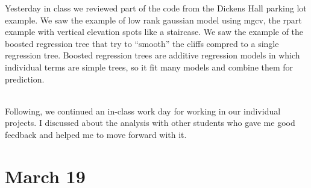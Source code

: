 \documentclass[
]{book}
\begin{document}
Yesterday in class we reviewed part of the code from the Dickens Hall parking lot example. We saw the example of low rank gaussian model using mgcv, the rpart example with vertical elevation spots like a staircase. We saw the example of the boosted regression tree that try to ``smooth'' the cliffs compred to a single regression tree. Boosted regression trees are additive regression models in which individual terms are simple trees, so it fit many models and combine them for prediction.\\
\strut \\
Following, we continued an in-class work day for working in our individual projects. I discussed about the analysis with other students who gave me good feedback and helped me to move forward with it.\\

\hypertarget{march-19}{%
\section{March 19}\label{march-19}}
\end{document}
